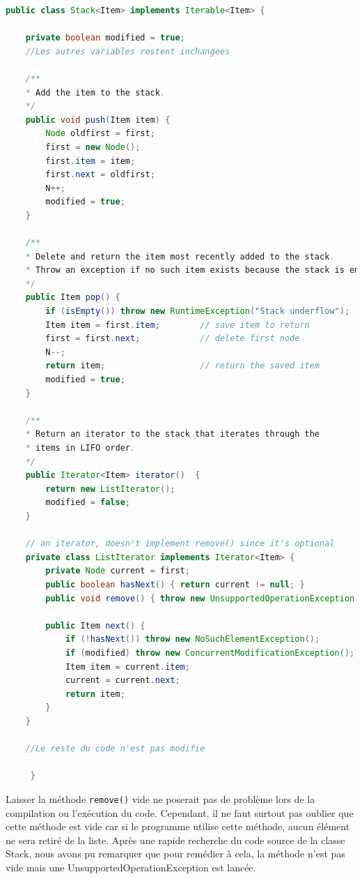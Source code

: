 \begin{enumerate}
	 \begin{lstlisting}[language=Java]
public class Stack<Item> implements Iterable<Item> {
	 
    private boolean modified = true;
    //Les autres variables restent inchangees
	 
    /**
    * Add the item to the stack.
    */
    public void push(Item item) {
        Node oldfirst = first;
        first = new Node();
        first.item = item;
        first.next = oldfirst;
        N++;
        modified = true;
    }
	 
    /**
    * Delete and return the item most recently added to the stack.
    * Throw an exception if no such item exists because the stack is empty.
    */
    public Item pop() {
        if (isEmpty()) throw new RuntimeException("Stack underflow");
        Item item = first.item;        // save item to return
        first = first.next;            // delete first node
        N--;
        return item;                   // return the saved item
        modified = true;
    }
    
    /**
    * Return an iterator to the stack that iterates through the 
    * items in LIFO order.
    */
    public Iterator<Item> iterator()  { 
    	return new ListIterator();
    	modified = false;
    }

    // an iterator, doesn't implement remove() since it's optional
    private class ListIterator implements Iterator<Item> {
        private Node current = first;
        public boolean hasNext() { return current != null; }
        public void remove() { throw new UnsupportedOperationException(); }

        public Item next() {
            if (!hasNext()) throw new NoSuchElementException();
            if (modified) throw new ConcurrentModificationException();
            Item item = current.item;
            current = current.next; 
            return item;
        }
    }
    
    //Le reste du code n'est pas modifie
	 
	 }
	 \end{lstlisting}
	 \vspace{0.5cm}
	 
	 Laisser la méthode \lstinline{remove()}\lstinline{} vide ne poserait pas de problème lors de la compilation ou l'exécution du code. Cependant, il ne faut surtout pas oublier que cette méthode est vide car si le programme utilise cette méthode, aucun élément ne sera retiré de la liste. Après une rapide recherche du code source de la classe Stack, nous avons pu remarquer que pour remédier à cela, la méthode n'est pas vide mais une UnsupportedOperationException est lancée.\\
	 

\end{enumerate}
